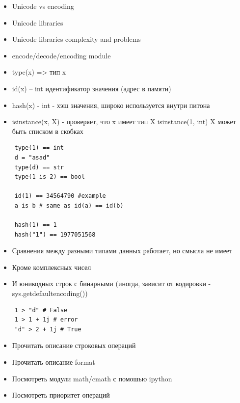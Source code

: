 \documentclass{article}
\begin{document}
\begin{itemize}
	\item Unicode vs encoding
	\item Unicode libraries
	\item Unicode libraries complexity and problems
	\item encode/decode/encoding module
\end{itemize}
\newpage

\begin{itemize}
	\item type(x) => тип x
	\item id(x) – int идентификатор значения (адрес в памяти)
	\item hash(x) - int - хэш значения, широко используется внутри питона
	\item isinstance(x, X) - проверяет, что x имеет тип X isinstance(1, int)
		X может быть списком в скобках
\end{itemize}

\vspace{15pt}
\begin{lstlisting}
	type(1) == int
	d = "asad"
	type(d) == str
	type(1 is 2) == bool

	id(1) == 34564790 #example
	a is b # same as id(a) == id(b)

	hash(1) == 1
	hash("1") == 1977051568
\end{lstlisting}

\newpage

\begin{itemize}
	\item Сравнения между разными типами данных работает, но смысла не имеет
	\item Кроме комплексных чисел
	\item И юникодных строк с бинарными (иногда, зависит от кодировки - sys.getdefaultencoding())
\end{itemize}
\begin{lstlisting}
	1 > "d" # False
	1 > 1 + 1j # error
	"d" > 2 + 1j # True
\end{lstlisting}
\newpage

\begin{itemize}
	\item Прочитать описание строковых операций
	\item Прочитать описание format
	\item Посмотреть модули math/cmath с помошью ipython
	\item Посмотреть приоритет операций
\end{itemize}
\end{document}
